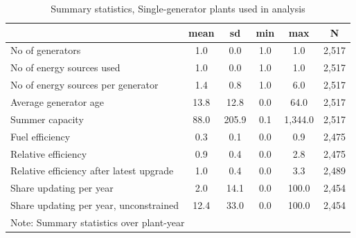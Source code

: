 \begin{table}[htbp]\centering
\footnotesize
\def\sym#1{\ifmmode^{#1}\else\(^{#1}\)\fi}
\caption{Summary statistics, Single-generator plants used in analysis}
\begin{tabular}{l*{1}{ccccc}}
\hline\hline
                    &        mean&          sd&         min&         max&           N\\
\hline
No of generators    &         1.0&         0.0&         1.0&         1.0&       2,517\\
No of energy sources used&         1.0&         0.0&         1.0&         1.0&       2,517\\
No of energy sources per generator&         1.4&         0.8&         1.0&         6.0&       2,517\\
Average generator age&        13.8&        12.8&         0.0&        64.0&       2,517\\
Summer capacity     &        88.0&       205.9&         0.1&     1,344.0&       2,517\\
Fuel efficiency     &         0.3&         0.1&         0.0&         0.9&       2,475\\
Relative efficiency &         0.9&         0.4&         0.0&         2.8&       2,475\\
Relative efficiency after latest upgrade&         1.0&         0.4&         0.0&         3.3&       2,489\\
Share updating per year&         2.0&        14.1&         0.0&       100.0&       2,454\\
Share updating per year, unconstrained&        12.4&        33.0&         0.0&       100.0&       2,454\\
\hline\hline
\multicolumn{6}{l}{\footnotesize Note: Summary statistics over plant-year}\\
\end{tabular}
\end{table}
